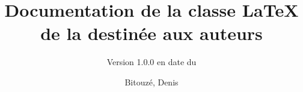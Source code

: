 \documentclass{gztarticle}
\newcommand{\releaseversion}{1.0.0}
\begin{document}
\title[short=Documentation de la classe de la \emph{Gazette} destinée aux
auteurs]{Documentation de la classe \LaTeX{} de la \gzt*{} destinée aux
  auteurs}
\subtitle[short=Version \releaseversion{}
(\displaydate{release-date})]{\bigskip\Large Version \releaseversion{} en date du
  }%
%
\author[%
affiliation={%
  Université du Littoral Côte d'Opale, Laboratoire de mathématiques pures et
  appliquées%
},%
photo=denis,%
email=denis.bitouze@lmpa.univ-littoral.fr,%
webpage=http://gte.univ-littoral.fr/members/dbitouze/pub/latex/,%
]{Bitouzé, Denis}
%
\maketitle*
%
\localtableofcontents
%




%
\printindex
%
\printbibliography
\end{document}
